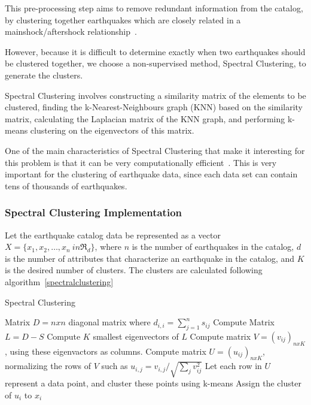 This pre-processing step aims to remove redundant information from the
catalog, by clustering together earthquakes which are closely related
in a mainshock/aftershock relationship~\cite{van2012seismicity}.

However, because it is difficult to determine exactly when two
earthquakes should be clustered together, we choose a non-supervised
method, Spectral Clustering, to generate the clusters.

Spectral Clustering involves constructing a similarity matrix of the
elements to be clustered, finding the k-Nearest-Neighbours graph (KNN)
based on the similarity matrix, calculating the Laplacian matrix of
the KNN graph, and performing k-means clustering on the eigenvectors
of this matrix.

One of the main characteristics of Spectral Clustering that make it
interesting for this problem is that it can be very computationally
efficient~\cite{Ye2016}. This is very important for the clustering of
earthquake data, since each data set can contain tens of thousands of
earthquakes.

\subsubsection*{Spectral Clustering Implementation}

Let the earthquake catalog data be represented as a vector $X = \{x_1,
x_2, \ldots, x_n\ in \Re_d\}$, where $n$ is the number of earthquakes
in the catalog, $d$ is the number of attributes that characterize an
earthquake in the catalog, and $K$ is the desired number of
clusters. The clusters are calculated following
algorithm~\ref{spectralclustering}

\begin{algorithm}[H]\label{spectralclustering}
  \caption{Spectral Clustering}
  \begin{algorithmic}
    \ELSE
    \ENDIF
    \ENDFOR
    \ENDFOR
    \STATE Matrix $D = n x n$ diagonal matrix where $d_{i,i} = \sum^n_{j=1}s_{ij}$
    \STATE Compute Matrix $L = D - S$
    \STATE Compute $K$ smallest eigenvectors of $L$
    \STATE Compute matrix $V = (v_{ij})_{nxK}$, using these eigenvactors as columns.
    \STATE Compute matrix $U = (u_{ij})_{nxK}$, normalizing the rows
    of $V$ such as $u_{i,j} = v_{i,j}/\sqrt{\sum_jv^2_{ij}}$
    \STATE Let each row in $U$ represent a data point, and cluster
    these points using k-means
    \STATE Assign the cluster of $u_i$ to $x_i$
    \ENDFOR
  \end{algorithmic}
\end{algorithm}

